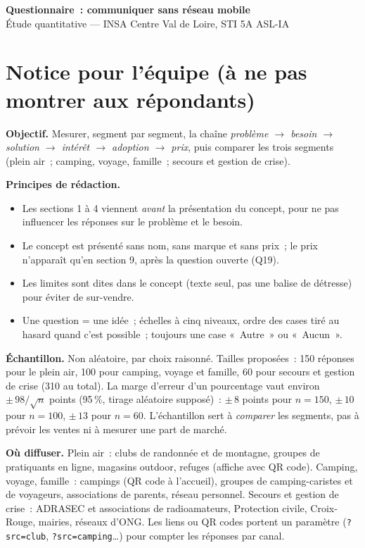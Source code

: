 \documentclass[11pt,a4paper]{article}
\begin{document}
\begin{center}
  {\Large\sffamily\bfseries Questionnaire~: communiquer sans réseau mobile}\\[4pt]
  {\sffamily Étude quantitative --- INSA Centre Val de Loire, STI 5A ASL-IA}
\end{center}

\section*{Notice pour l'équipe (à ne pas montrer aux répondants)}

\textbf{Objectif.} Mesurer, segment par segment, la chaîne \emph{problème $\rightarrow$ besoin $\rightarrow$
solution $\rightarrow$ intérêt $\rightarrow$ adoption $\rightarrow$ prix}, puis comparer les trois segments
(plein air~; camping, voyage, famille~; secours et gestion de crise).

\textbf{Principes de rédaction.}
\begin{itemize}[nosep]
  \item Les sections 1 à 4 viennent \emph{avant} la présentation du concept, pour ne pas influencer les réponses sur le problème et le besoin.
  \item Le concept est présenté sans nom, sans marque et sans prix~; le prix n'apparaît qu'en section 9, après la question ouverte (Q19).
  \item Les limites sont dites dans le concept (texte seul, pas une balise de détresse) pour éviter de sur-vendre.
  \item Une question = une idée~; échelles à cinq niveaux, ordre des cases tiré au hasard quand c'est possible~; toujours une case «~Autre~» ou «~Aucun~».
\end{itemize}

\textbf{Échantillon.} Non aléatoire, par choix raisonné. Tailles proposées~: 150 réponses pour le plein air,
100 pour camping, voyage et famille, 60 pour secours et gestion de crise (310 au total). La marge d'erreur d'un
pourcentage vaut environ $\pm\,98/\sqrt{n}$ points (95\,\%, tirage aléatoire supposé)~: $\pm\,8$ points pour $n=150$,
$\pm\,10$ pour $n=100$, $\pm\,13$ pour $n=60$. L'échantillon sert à \emph{comparer} les segments, pas à prévoir
les ventes ni à mesurer une part de marché.

\textbf{Où diffuser.} Plein air~: clubs de randonnée et de montagne, groupes de pratiquants en ligne, magasins outdoor,
refuges (affiche avec QR code). Camping, voyage, famille~: campings (QR code à l'accueil), groupes de camping-caristes
et de voyageurs, associations de parents, réseau personnel. Secours et gestion de crise~: ADRASEC et associations de
radioamateurs, Protection civile, Croix-Rouge, mairies, réseaux d'ONG. Les liens ou QR codes portent un paramètre
(\texttt{?src=club}, \texttt{?src=camping}\dots) pour compter les réponses par canal.
\end{document}
